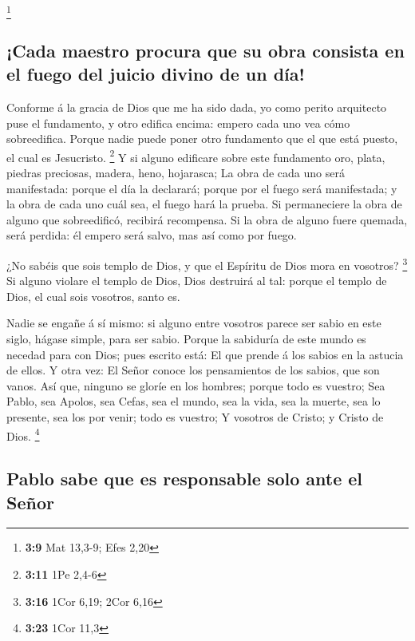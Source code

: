 \footnote{\textbf{3:9} Mat 13,3-9; Efes 2,20}

\hypertarget{cada-maestro-procura-que-su-obra-consista-en-el-fuego-del-juicio-divino-de-un-duxeda}{%
\subsection{¡Cada maestro procura que su obra consista en el fuego del
juicio divino de un
día!}\label{cada-maestro-procura-que-su-obra-consista-en-el-fuego-del-juicio-divino-de-un-duxeda}}

 Conforme á la gracia de Dios que me ha sido dada, yo
como perito arquitecto puse el fundamento, y otro edifica encima: empero
cada uno vea cómo sobreedifica.  Porque nadie puede poner
otro fundamento que el que está puesto, el cual es Jesucristo.
\footnote{\textbf{3:11} 1Pe 2,4-6}  Y si alguno edificare
sobre este fundamento oro, plata, piedras preciosas, madera, heno,
hojarasca;  La obra de cada uno será manifestada: porque
el día la declarará; porque por el fuego será manifestada; y la obra de
cada uno cuál sea, el fuego hará la prueba.  Si
permaneciere la obra de alguno que sobreedificó, recibirá recompensa.
 Si la obra de alguno fuere quemada, será perdida: él
empero será salvo, mas así como por fuego.

 ¿No sabéis que sois templo de Dios, y que el Espíritu de
Dios mora en vosotros? \footnote{\textbf{3:16} 1Cor 6,19; 2Cor 6,16}
 Si alguno violare el templo de Dios, Dios destruirá al
tal: porque el templo de Dios, el cual sois vosotros, santo es.

 Nadie se engañe á sí mismo: si alguno entre vosotros
parece ser sabio en este siglo, hágase simple, para ser sabio.
 Porque la sabiduría de este mundo es necedad para con
Dios; pues escrito está: El que prende á los sabios en la astucia de
ellos.  Y otra vez: El Señor conoce los pensamientos de
los sabios, que son vanos.  Así que, ninguno se gloríe en
los hombres; porque todo es vuestro;  Sea Pablo, sea
Apolos, sea Cefas, sea el mundo, sea la vida, sea la muerte, sea lo
presente, sea los por venir; todo es vuestro;  Y vosotros
de Cristo; y Cristo de Dios. \footnote{\textbf{3:23} 1Cor 11,3}

\hypertarget{pablo-sabe-que-es-responsable-solo-ante-el-seuxf1or}{%
\subsection{Pablo sabe que es responsable solo ante el
Señor}\label{pablo-sabe-que-es-responsable-solo-ante-el-seuxf1or}}

